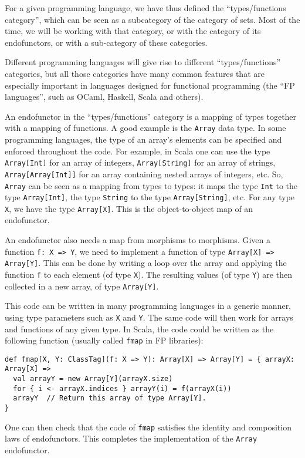 For a given programming language, we have thus defined the \textsf{``}types/functions
category\textsf{''}, which can be seen as a subcategory of the category of
sets. Most of the time, we will be working with that category, or
with the category of its endofunctors, or with a sub-category of these
categories.

Different programming languages will give rise to different \textsf{``}types/functions\textsf{''}
categories, but all those categories have many common features that
are especially important in languages designed for functional programming
(the \textsf{``}FP languages\textsf{''}, such as OCaml, Haskell, Scala and others).


An endofunctor in the \textsf{``}types/functions\textsf{''} category is a mapping
of types together with a mapping of functions. A good example is the
\lstinline!Array! data type. In some programming languages, the type
of an array\textsf{'}s elements can be specified and enforced throughout the
code. For example, in Scala one can use the type \lstinline!Array[Int]!
for an array of integers, \lstinline!Array[String]! for an array
of strings, \lstinline!Array[Array[Int]]! for an array containing
nested arrays of integers, etc. So, \lstinline!Array! can be seen
as a mapping from types to types: it maps the type \lstinline!Int!
to the type \lstinline!Array[Int]!, the type \lstinline!String!
to the type \lstinline!Array[String]!, etc. For any type \lstinline!X!,
we have the type \lstinline!Array[X]!. This is the object-to-object
map of an endofunctor.

An endofunctor also needs a map from morphisms to morphisms. Given
a function \lstinline!f: X => Y!, we need to implement a function
of type \lstinline!Array[X] => Array[Y]!. This can be done by writing
a loop over the array and applying the function \lstinline!f! to
each element (of type \lstinline!X!). The resulting values (of type
\lstinline!Y!) are then collected in a new array, of type \lstinline!Array[Y]!.

This code can be written in many programming languages in a generic
manner, using type parameters such as \lstinline!X! and \lstinline!Y!.
The same code will then work for arrays and functions of any given
type. In Scala, the code could be written as the following function
(usually called \lstinline!fmap! in FP libraries):
\begin{lstlisting}
def fmap[X, Y: ClassTag](f: X => Y): Array[X] => Array[Y] = { arrayX: Array[X] =>
  val arrayY = new Array[Y](arrayX.size)
  for { i <- arrayX.indices } arrayY(i) = f(arrayX(i))
  arrayY  // Return this array of type Array[Y].
}
\end{lstlisting}
One can then check that the code of \lstinline!fmap! satisfies the
identity and composition laws of endofunctors. This completes the
implementation of the \lstinline!Array! endofunctor.


